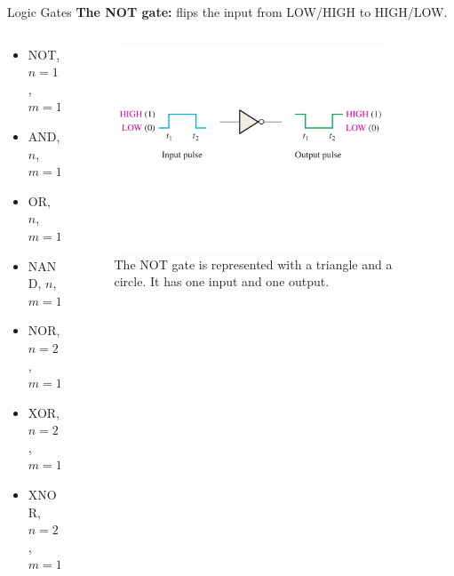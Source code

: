 \documentclass{beamer}
\begin{document}
\begin{frame}{Logic Gates}
\textbf{The NOT gate:} flips the input from LOW/HIGH to HIGH/LOW. \\ \vspace{0.5cm}
\begin{columns}[T]
\begin{column}{0.5\textwidth}
\begin{itemize}
\item \alert{NOT, $n=1$, $m=1$}
\item AND, $n$, $m=1$
\item OR, $n$, $m=1$
\item NAND, $n$, $m=1$
\item NOR, $n=2$, $m=1$
\item XOR, $n=2$, $m=1$
\item XNOR, $n=2$, $m=1$
\end{itemize}
\end{column}
\begin{column}{0.5\textwidth}
\begin{figure}
\centering
\includegraphics[width=0.9\textwidth,trim=0cm 6cm 0cm 4cm,clip=true]{figures/newNot.pdf}
\caption{\label{fig:not} The NOT gate is represented with a triangle and a circle.  It has one input and one output.}
\end{figure}
\end{column}
\end{columns}
\end{frame}
\end{document}

